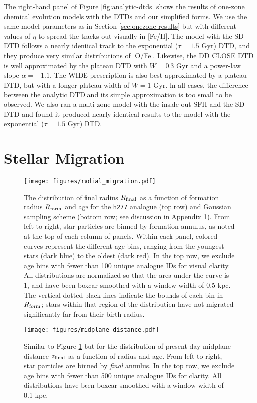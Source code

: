 \documentclass[twocolumn,twocolappendix,linenumbers]{aastex631}
\newcommand{\hydro}{{\tt h277}\xspace}
\begin{document}
The right-hand panel of Figure \ref{fig:analytic-dtds} shows the results of one-zone chemical evolution models with the \citet{Greggio2005-AnalyticalRates} DTDs and our simplified forms. We use the same model parameters as in Section \ref{sec:onezone-results} but with different values of $\eta$ to spread the tracks out visually in [Fe/H]. The model with the SD DTD follows a nearly identical track to the exponential ($\tau=1.5$ Gyr) DTD, and they produce very similar distributions of [O/Fe]. Likewise, the DD CLOSE DTD is well approximated by the plateau DTD with $W=0.3$ Gyr and a power-law slope $\alpha=-1.1$. The WIDE prescription is also best approximated by a plateau DTD, but with a longer plateau width of $W=1$ Gyr. In all cases, the difference between the analytic DTD and its simple approximation is too small to be observed. We also ran a multi-zone model with the inside-out SFH and the \citet{Greggio2005-AnalyticalRates} SD DTD and found it produced nearly identical results to the model with the exponential ($\tau=1.5$ Gyr) DTD.

\section{Stellar Migration}
\label{app:migration}

\begin{figure*}
    \centering
    \texttt{[image: figures/radial\_migration.pdf]}
    \caption{The distribution of final radius $R_{\rm final}$ as a function of formation radius $R_{\rm form}$ and age for the \hydro analogue (top row) and Gaussian sampling scheme (bottom row; see discussion in Appendix \ref{app:migration}). From left to right, star particles are binned by formation annulus, as noted at the top of each column of panels. Within each panel, colored curves represent the different age bins, ranging from the youngest stars (dark blue) to the oldest (dark red). In the top row, we exclude age bins with fewer than 100 unique analogue IDs for visual clarity. All distributions are normalized so that the area under the curve is 1, and have been boxcar-smoothed with a window width of 0.5 kpc. The vertical dotted black lines indicate the bounds of each bin in $R_{\rm form}$; stars within that region of the distribution have not migrated significantly far from their birth radius.}
    \label{fig:radial-migration}
\end{figure*}

\begin{figure*}
    \centering
    \texttt{[image: figures/midplane\_distance.pdf]}
    \caption{Similar to Figure \ref{fig:radial-migration} but for the distribution of present-day midplane distance $z_{\rm final}$ as a function of radius and age. From left to right, star particles are binned by \textit{final} annulus. In the top row, we exclude age bins with fewer than 500 unique analogue IDs for clarity. All distributions have been boxcar-smoothed with a window width of 0.1 kpc.}
    \label{fig:midplane-distance}
\end{figure*}
\end{document}

